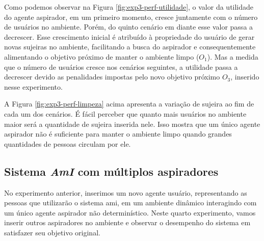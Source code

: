 Como podemos observar na Figura \ref{fig:exp3-perf-utilidade}, o valor da utilidade do agente aspirador, em um primeiro momento, cresce juntamente com o número de usuários no ambiente. Porém, do quinto cenário em diante esse valor passa a decrescer. Esse crescimento inicial é atribuído à propriedade do usuário de gerar novas sujeiras no ambiente, facilitando a busca do aspirador e consequentemente alimentando o objetivo próximo de manter o ambiente limpo ($O_1$). Mas a medida que o número de usuários cresce nos cenários seguintes, a utilidade passa a decrescer devido as penalidades impostas pelo novo objetivo próximo $O_3$, inserido nesse experimento. 

\begin{figure}[h!]
    \centering
\end{figure}

A Figura \ref{fig:exp3-perf-limpeza} acima apresenta a variação de sujeira ao fim de cada um dos cenários.  É fácil perceber que quanto mais usuários no ambiente maior será a quantidade de sujeira inserida nele. Isso mostra que um único agente aspirador não é suficiente para manter o ambiente limpo quando grandes quantidades de pessoas circulam por ele.

\subsection{Sistema \textit{AmI} com múltiplos aspiradores}
\label{sec:multi-asp}
No experimento anterior, inserimos um novo agente usuário, representando as pessoas que utilizarão o sistema \acrshort{ami}, em um ambiente dinâmico interagindo com um único agente aspirador não determinístico. Neste quarto experimento, vamos inserir outros aspiradores no ambiente e observar o desempenho do sistema em satisfazer seu objetivo original. 

